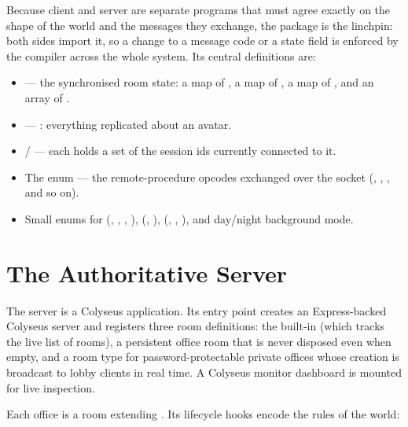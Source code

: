 Because client and server are separate programs that must agree exactly on the
shape of the world and the messages they exchange, the  package is
the linchpin: both sides import it, so a change to a message code or a state field
is enforced by the compiler across the whole system. Its central definitions are:

\begin{itemize}
  \item {} --- the synchronised room state: a map of
  , a map of , a map of , and an
  array of .
  \item {} --- : everything replicated about an avatar.
  \item {} /  --- each holds a set of the session
  ids currently connected to it.
  \item The  enum --- the remote-procedure opcodes exchanged over
  the socket (, ,
  , and so on).
  \item Small enums for  (, ,
  , ), 
  (, ),  (, ,
  ), and day/night background mode.
\end{itemize}

\section{The Authoritative Server}

The server is a Colyseus application. Its entry point creates an Express-backed
Colyseus server and registers three room definitions: the built-in
 (which tracks the live list of rooms), a persistent
 office room that is never disposed even when empty, and a
 room type for password-protectable private offices whose creation is
broadcast to lobby clients in real time. A Colyseus monitor dashboard is mounted
for live inspection.

Each office is a  room extending . Its
lifecycle hooks encode the rules of the world:


